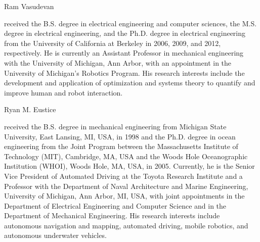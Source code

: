 \documentclass[journal]{style/IEEEtran}
\theoremstyle{nospace}
\begin{document}
\begin{IEEEbiography}{Ram Vasudevan}

received the B.S. degree in electrical engineering and computer sciences, the M.S. degree in electrical engineering, and the Ph.D. degree in electrical engineering from the University of California at Berkeley in 2006, 2009, and 2012, respectively.
He is currently an Assistant Professor in mechanical engineering with the University of Michigan, Ann Arbor, with an appointment in the University of Michigan’s Robotics Program. His research interests include the development and application of optimization and systems theory to quantify and improve human and robot interaction.
\end{IEEEbiography}

\vspace{-1 cm}

\begin{IEEEbiography}{Ryan M. Eustice}

received the B.S. degree in mechanical engineering from Michigan State University, East Lansing, MI, USA, in 1998 and the Ph.D. degree in ocean engineering from the Joint Program between the Massachusetts Institute of Technology (MIT), Cambridge, MA, USA and the Woods Hole Oceanographic Institution (WHOI), Woods Hole, MA, USA, in 2005. Currently, he is the Senior Vice President of Automated Driving at the Toyota Research Institute and a Professor with the Department of Naval Architecture and Marine Engineering, University of Michigan, Ann Arbor, MI, USA, with joint appointments in the Department of Electrical Engineering and Computer Science and in the Department of Mechanical Engineering. His research interests include autonomous navigation and mapping, automated driving, mobile robotics, and autonomous underwater vehicles.

\end{IEEEbiography}

\end{document}
